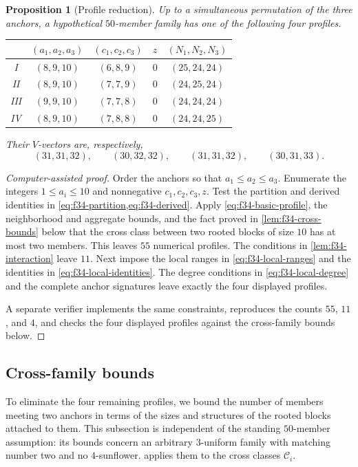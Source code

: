 \documentclass[11pt]{article}
\numberwithin{equation}{section}
\newtheorem{proposition}[proposition]{Proposition}
\theoremstyle{definition}
\theoremstyle{remark}
\newcommand{\C}{\mathcal C}
\begin{document}
\begin{proposition}[Profile reduction]
\label{prop:f34-profiles}
Up to a simultaneous permutation of the three anchors, a hypothetical
$50$-member family has one of the following four profiles.
\begin{center}
\begin{tabular}{@{}ccccc@{}}
\toprule
&$(a_1,a_2,a_3)$&$(c_1,c_2,c_3)$&$z$&$(N_1,N_2,N_3)$\\
\midrule
I   &$(8,9,10)$&$(6,8,9)$&$0$&$(25,24,24)$\\
II  &$(8,9,10)$&$(7,7,9)$&$0$&$(24,25,24)$\\
III &$(9,9,10)$&$(7,7,8)$&$0$&$(24,24,24)$\\
IV  &$(8,9,10)$&$(7,8,8)$&$0$&$(24,24,25)$\\
\bottomrule
\end{tabular}
\end{center}
Their $V$-vectors are, respectively,
\[
 (31,31,32),\qquad
 (30,32,32),\qquad
 (31,31,32),\qquad
 (30,31,33).
\]
\end{proposition}

\begin{proof}[Computer-assisted proof]
Order the anchors so that $a_1\le a_2\le a_3$. Enumerate the integers
$1\le a_i\le10$ and nonnegative $c_1,c_2,c_3,z$. Test the partition and
derived identities in
\cref{eq:f34-partition,eq:f34-derived}. Apply
\cref{eq:f34-basic-profile}, the neighborhood and aggregate bounds, and the
fact proved in \cref{lem:f34-cross-bounds} below that the cross class between
two rooted blocks of size $10$ has at most two members. This leaves $55$
numerical profiles. The conditions in \cref{lem:f34-interaction} leave $11$.
Next impose the local ranges in \cref{eq:f34-local-ranges} and the identities
in \cref{eq:f34-local-identities}. The degree conditions in
\cref{eq:f34-local-degree} and the complete anchor signatures leave exactly
the four displayed profiles.

A separate verifier implements the same constraints, reproduces the counts
$55$, $11$, and $4$, and checks the four displayed profiles against the
cross-family bounds below.
\end{proof}

\subsection{Cross-family bounds}

To eliminate the four remaining profiles, we bound the number of members
meeting two anchors in terms of the sizes and structures of the rooted blocks
attached to them. This subsection is independent of the standing
$50$-member assumption: its bounds concern an arbitrary $3$-uniform family
with matching number two and no $4$-sunflower. 
applies them to the cross classes $\C_i$.
\end{document}

